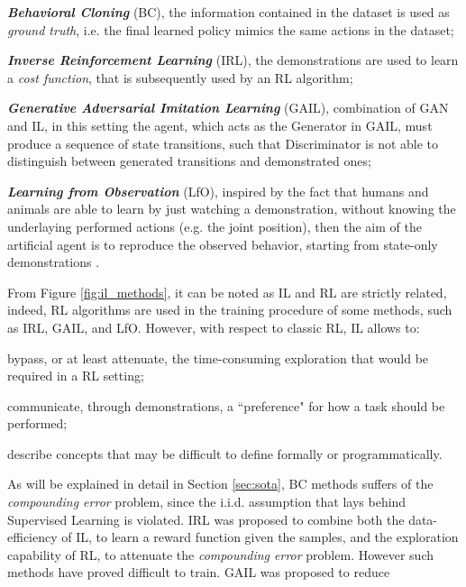 \begin{itemize*}
    \item \textbf{\textit{Behavioral Cloning}} (BC), the information contained in the dataset is used as \textit{ground
    truth}, i.e. the final learned policy mimics the same actions in the dataset;
    \item \textbf{\textit{Inverse Reinforcement Learning}} (IRL), the demonstrations are used to learn a \textit{cost
    function}, that is subsequently used by an RL algorithm;
    \item \textbf{\textit{Generative Adversarial Imitation Learning}} (GAIL), combination of GAN and IL, in this
    setting the agent, which acts as the Generator in GAIL, must produce a sequence of state transitions, such that
    Discriminator is not able to distinguish between generated transitions and demonstrated ones;
    \item \textbf{\textit{Learning from Observation}} (LfO), inspired by the fact that humans and animals are able to
    learn by just watching a demonstration, without knowing the underlaying performed actions (e.g. the joint position),
    then the aim of the artificial agent is to reproduce the observed behavior, starting from state-only demonstrations
    \cite{torabi2019recent_advances_lfo}.  
\end{itemize*}

From Figure \ref{fig:il_methods}, it can be noted as IL and RL are strictly related, indeed, RL algorithms are used in
the training procedure of some methods, such as IRL, GAIL, and LfO. However, with respect to classic RL, IL allows to:
\begin{enumerate*}[label=\textbf{(\arabic*)}]
    \item bypass, or at least attenuate, the time-consuming exploration that would be required in a RL setting;
    \item communicate, through demonstrations, a ``preference" for how a task should be performed;
    \item describe concepts that may be difficult to define formally or programmatically. \end{enumerate*} As will be
explained in detail in Section \ref{sec:sota}, BC methods suffers of the \textit{compounding error} problem, since the
i.i.d. assumption that lays behind Supervised Learning is violated. IRL was proposed to combine both the
data-efficiency of IL, to learn a reward function given the samples, and the exploration capability of RL, to attenuate
the \textit{compounding error} problem. However such methods have proved difficult to train. GAIL was proposed to reduce
